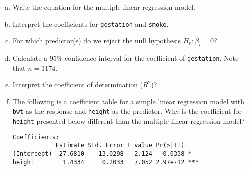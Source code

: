 \documentclass[11pt, fleqn]{article}\usepackage[]{graphicx}\usepackage[]{color}
\begin{document}
\begin{enumerate}[(a)]
\item Write the equation for the multiple linear regression model.
\vspace{1.5cm}
\item Interpret the coefficients for \texttt{gestation} and \texttt{smoke}.
\vspace{4.5cm}
\item For which predictor(s) do we reject the null hypothesis $H_0: \beta_i = 0$?   
\vspace{1.5cm}
\item Calculate a 95\% confidence interval for the coefficient of \texttt{gestation}.  Note that $n=1174$.
\vspace{3cm}
\item Interpret the coefficient of determination ($R^2$)?
\vspace{2cm}
\item The following is a coefficient table for a simple linear regression model  with \texttt{bwt} as the response and \texttt{height} as the predictor.  Why is the coefficient for \texttt{height} presented below different than the multiple linear regression model?
\begin{verbatim}
Coefficients:
            Estimate Std. Error t value Pr(>|t|)    
(Intercept)  27.6810    13.0298   2.124   0.0338 *  
height        1.4334     0.2033   7.052 2.97e-12 ***
\end{verbatim}
\end{enumerate}
\end{document}
